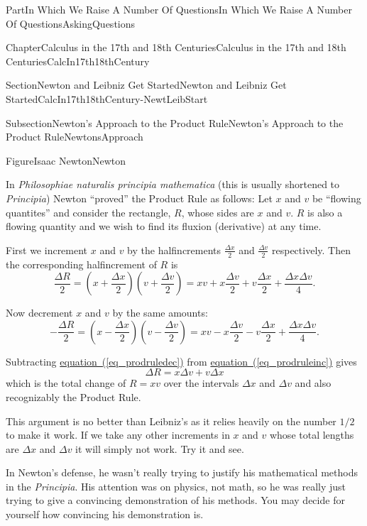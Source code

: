 \documentclass[oneside,10pt,]{book}
\newcommand{\xreffont}{\relax}
\newcommand{\pubtitle}[1]{\textsl{#1}}
\numberwithin{equation}{part}
\begin{document}
\begin{partptx}{Part}{In Which We Raise A Number Of Questions}{}{In Which We Raise A Number Of Questions}{}{}{AskingQuestions}
\begin{chapterptx}{Chapter}{Calculus in the 17th and 18th Centuries}{}{Calculus in the 17th and 18th Centuries}{}{}{CalcIn17th18thCentury}
\begin{sectionptx}{Section}{Newton and Leibniz Get Started}{}{Newton and Leibniz Get Started}{}{}{CalcIn17th18thCentury-NewtLeibStart}
\begin{subsectionptx}{Subsection}{Newton's Approach to the Product Rule}{}{Newton's Approach to the Product Rule}{}{}{NewtonsApproach}
\begin{figureptx}{Figure}{Isaac Newton}{Newton}{}
\tcblower
\end{figureptx}%
In \pubtitle{Philosophiae naturalis principia mathematica} (this is usually shortened to \pubtitle{Principia}) Newton ``proved'' the Product Rule as follows: Let \(x\) and \(v\) be ``flowing quantites'' and consider the rectangle, \(R\), whose sides are \(x\) and \(v\).  \(R\) is also a flowing quantity and we wish to find its fluxion (derivative) at any time.%
\par
First we increment \(x\) and \(v\) by the half\textendash{}increments \(\frac{\Delta
x}{2}\) and \(\frac{\Delta v}{2}\) respectively.  Then the corresponding half\textendash{}increment of \(R\) is%
\begin{equation}
\frac{\Delta R}{2}=\left(x+\frac{\Delta x}{2}\right)\left(v+\frac{\Delta v}{2}\right) = xv + x\frac{\Delta v}{2} + v\frac{\Delta x}{2} +\frac{\Delta x\Delta v}{4}\text{.}\label{eq_prodruleinc}
\end{equation}
%
\par
Now decrement \(x\) and \(v\) by the same amounts:%
\begin{equation}
-\frac{\Delta R}{2}=\left(x-\frac{\Delta x}{2}\right)\left(v-\frac{\Delta v}{2}\right) = xv - x\frac{\Delta v}{2} - v\frac{\Delta x}{2} + \frac{\Delta x\Delta v}{4}\text{.}\label{eq_prodruledec}
\end{equation}
%
\par
Subtracting  \hyperref[eq_prodruledec]{equation~({\xreffont\ref{eq_prodruledec}})} from  \hyperref[eq_prodruleinc]{equation~({\xreffont\ref{eq_prodruleinc}})} gives%
\begin{equation*}
\Delta R = x\Delta v + v\Delta x
\end{equation*}
which is the total change of \(R = xv\) over the intervals \(\Delta x\) and \(\Delta v\) and also recognizably the Product Rule.%
\par
This argument is no better than Leibniz's as it relies heavily on the number \(1/2\) to make it work.  If we take any other increments in \(x\) and \(v\) whose total lengths are \(\Delta x\) and \(\Delta v\) it will simply not work.  Try it and see.%
\par
In Newton's defense, he wasn't really trying to justify his mathematical methods in the \pubtitle{Principia}.  His attention was on physics, not math, so he was really just trying to give a convincing demonstration of his methods.  You may decide for yourself how convincing his demonstration is.%
\par

\end{subsectionptx}
\end{sectionptx}
\end{chapterptx}
\end{partptx}
\end{document}
